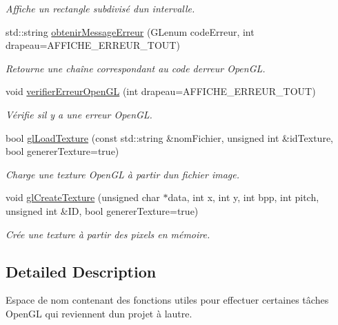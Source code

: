 \begin{DoxyCompactItemize}
\begin{DoxyCompactList}\small\item\em Affiche un rectangle subdivisé d\textquotesingle{}un intervalle. \end{DoxyCompactList}\item 
std\+::string \hyperlink{namespaceaidegl_a19ef7b4b71b7a1568393cfc78be46a91}{obtenir\+Message\+Erreur} (G\+Lenum code\+Erreur, int drapeau=A\+F\+F\+I\+C\+H\+E\+\_\+\+E\+R\+R\+E\+U\+R\+\_\+\+T\+O\+U\+T)
\begin{DoxyCompactList}\small\item\em Retourne une chaîne correspondant au code d\textquotesingle{}erreur Open\+G\+L. \end{DoxyCompactList}\item 
void \hyperlink{namespaceaidegl_a923ac6c4f17f9d93b072c786e0f86d41}{verifier\+Erreur\+Open\+G\+L} (int drapeau=A\+F\+F\+I\+C\+H\+E\+\_\+\+E\+R\+R\+E\+U\+R\+\_\+\+T\+O\+U\+T)
\begin{DoxyCompactList}\small\item\em Vérifie s\textquotesingle{}il y a une erreur Open\+G\+L. \end{DoxyCompactList}\item 
bool \hyperlink{namespaceaidegl_a6bba7d34e4998b9c94fe5971ecf535c0}{gl\+Load\+Texture} (const std\+::string \&nom\+Fichier, unsigned int \&id\+Texture, bool generer\+Texture=true)
\begin{DoxyCompactList}\small\item\em Charge une texture Open\+G\+L à partir d\textquotesingle{}un fichier image. \end{DoxyCompactList}\item 
void \hyperlink{namespaceaidegl_af6f5a219dd414d647d8e4d92b6c30fd5}{gl\+Create\+Texture} (unsigned char $\ast$data, int x, int y, int bpp, int pitch, unsigned int \&I\+D, bool generer\+Texture=true)
\begin{DoxyCompactList}\small\item\em Crée une texture à partir des pixels en mémoire. \end{DoxyCompactList}\end{DoxyCompactItemize}


\subsection{Detailed Description}
Espace de nom contenant des fonctions utiles pour effectuer certaines tâches Open\+G\+L qui reviennent d\textquotesingle{}un projet à l\textquotesingle{}autre. 

